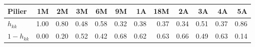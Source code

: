 {\footnotesize\setlength{\tabcolsep}{4pt}\begin{tabular}{lrrrrrrrrrrr}
\toprule
Pilier & 1M & 2M & 3M & 6M & 9M & 1A & 18M & 2A & 3A & 4A & 5A \\
\midrule
$h_{kk}$ & \num{1.00} & \num{0.80} & \num{0.48} & \num{0.58} & \num{0.32} & \num{0.38} & \num{0.37} & \num{0.34} & \num{0.51} & \num{0.37} & \num{0.86} \\
$1-h_{kk}$ & \num{0.00} & \num{0.20} & \num{0.52} & \num{0.42} & \num{0.68} & \num{0.62} & \num{0.63} & \num{0.66} & \num{0.49} & \num{0.63} & \num{0.14} \\
\bottomrule
\end{tabular}}
